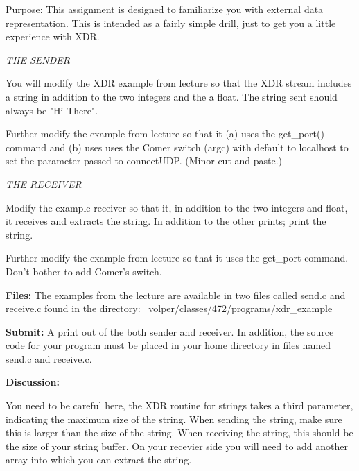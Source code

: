 

\parindent 0pt

Purpose: This assignment is designed to familiarize you
with external data representation.
This is intended as a fairly simple drill, just to get
you a little experience with XDR.

{\it THE SENDER}

You will modify the XDR example from lecture so that the XDR stream
includes a string in addition to the two integers and the a float.
The string sent should always be {\ltt{}"Hi There"}.

Further modify the example from lecture so that it
(a) uses the {\ltt{}get_port()} command
and
(b) uses uses the Comer switch ({\ltt{}argc}) with
default to localhost to set the parameter passed to {\ltt{}connectUDP}.
(Minor cut and paste.)

{\it THE RECEIVER}

Modify the example receiver so that it, in addition to the
two integers and float, it receives and extracts
the string.
In addition to the other prints;
print the string.

Further modify the example from lecture so that it
uses the {\ltt{}get_port} command.
Don't bother to add Comer's switch.

{\bf Files:}
The examples from the lecture are available in
two files called {\ltt{}send.c} and {\ltt{}receive.c}
found in the directory:
\hfill\break
{\ltt{}~volper/classes/472/programs/xdr_example}

{\bf Submit:}
A print out of the both sender and receiver.
In addition,
the source code for your program must be placed in your home directory
in files named {\ltt{}send.c} and {\ltt{}receive.c}.

{\bf Discussion:}

You need to be careful here, the XDR routine for strings
takes a third parameter, indicating the maximum size
of the string.
When sending the string, make sure this is larger than
the size of the string.
When receiving the string, this should be the size
of your string buffer.
On your recevier side you will need to add another array
into which you can extract the string.

\bye
